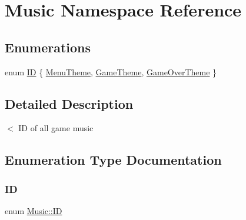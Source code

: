 \hypertarget{namespace_music}{}\section{Music Namespace Reference}
\label{namespace_music}
\subsection*{Enumerations}
\begin{DoxyCompactItemize}
\item 
enum \hyperlink{namespace_music_ad5e0c8c2e2e7bdcbffbb125051531b86}{ID} \{ \hyperlink{namespace_music_ad5e0c8c2e2e7bdcbffbb125051531b86a6bcadfc9c1f05aec18efb26a7bec3bc0}{Menu\+Theme}, 
\hyperlink{namespace_music_ad5e0c8c2e2e7bdcbffbb125051531b86a44f9c738509f7ee2454531d77fc159fd}{Game\+Theme}, 
\hyperlink{namespace_music_ad5e0c8c2e2e7bdcbffbb125051531b86aabebfd1ea9408ba5392cda5b3d2586a5}{Game\+Over\+Theme}
 \}
\end{DoxyCompactItemize}


\subsection{Detailed Description}
$<$ ID of all game music 

\subsection{Enumeration Type Documentation}
\mbox{\label{namespace_music_ad5e0c8c2e2e7bdcbffbb125051531b86}} 
\subsubsection{\texorpdfstring{ID}{ID}}
{\footnotesize\ttfamily enum \hyperlink{namespace_music_ad5e0c8c2e2e7bdcbffbb125051531b86}{Music\+::\+ID}}

